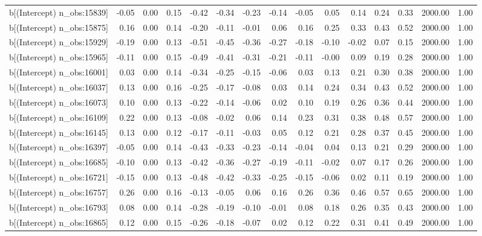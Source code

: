 \begin{table}[ht]
\begin{tabular}{rrrrrrrrrrrrrrr}
  b[(Intercept) n\_obs:15839] & -0.05 & 0.00 & 0.15 & -0.42 & -0.34 & -0.23 & -0.14 & -0.05 & 0.05 & 0.14 & 0.24 & 0.33 & 2000.00 & 1.00 \\ 
  b[(Intercept) n\_obs:15875] & 0.16 & 0.00 & 0.14 & -0.20 & -0.11 & -0.01 & 0.06 & 0.16 & 0.25 & 0.33 & 0.43 & 0.52 & 2000.00 & 1.00 \\ 
  b[(Intercept) n\_obs:15929] & -0.19 & 0.00 & 0.13 & -0.51 & -0.45 & -0.36 & -0.27 & -0.18 & -0.10 & -0.02 & 0.07 & 0.15 & 2000.00 & 1.00 \\ 
  b[(Intercept) n\_obs:15965] & -0.11 & 0.00 & 0.15 & -0.49 & -0.41 & -0.31 & -0.21 & -0.11 & -0.00 & 0.09 & 0.19 & 0.28 & 2000.00 & 1.00 \\ 
  b[(Intercept) n\_obs:16001] & 0.03 & 0.00 & 0.14 & -0.34 & -0.25 & -0.15 & -0.06 & 0.03 & 0.13 & 0.21 & 0.30 & 0.38 & 2000.00 & 1.00 \\ 
  b[(Intercept) n\_obs:16037] & 0.13 & 0.00 & 0.16 & -0.25 & -0.17 & -0.08 & 0.03 & 0.14 & 0.24 & 0.34 & 0.43 & 0.52 & 2000.00 & 1.00 \\ 
  b[(Intercept) n\_obs:16073] & 0.10 & 0.00 & 0.13 & -0.22 & -0.14 & -0.06 & 0.02 & 0.10 & 0.19 & 0.26 & 0.36 & 0.44 & 2000.00 & 1.00 \\ 
  b[(Intercept) n\_obs:16109] & 0.22 & 0.00 & 0.13 & -0.08 & -0.02 & 0.06 & 0.14 & 0.23 & 0.31 & 0.38 & 0.48 & 0.57 & 2000.00 & 1.00 \\ 
  b[(Intercept) n\_obs:16145] & 0.13 & 0.00 & 0.12 & -0.17 & -0.11 & -0.03 & 0.05 & 0.12 & 0.21 & 0.28 & 0.37 & 0.45 & 2000.00 & 1.00 \\ 
  b[(Intercept) n\_obs:16397] & -0.05 & 0.00 & 0.14 & -0.43 & -0.33 & -0.23 & -0.14 & -0.04 & 0.04 & 0.13 & 0.21 & 0.29 & 2000.00 & 1.00 \\ 
  b[(Intercept) n\_obs:16685] & -0.10 & 0.00 & 0.13 & -0.42 & -0.36 & -0.27 & -0.19 & -0.11 & -0.02 & 0.07 & 0.17 & 0.26 & 2000.00 & 1.00 \\ 
  b[(Intercept) n\_obs:16721] & -0.15 & 0.00 & 0.13 & -0.48 & -0.42 & -0.33 & -0.25 & -0.15 & -0.06 & 0.02 & 0.11 & 0.19 & 2000.00 & 1.00 \\ 
  b[(Intercept) n\_obs:16757] & 0.26 & 0.00 & 0.16 & -0.13 & -0.05 & 0.06 & 0.16 & 0.26 & 0.36 & 0.46 & 0.57 & 0.65 & 2000.00 & 1.00 \\ 
  b[(Intercept) n\_obs:16793] & 0.08 & 0.00 & 0.14 & -0.28 & -0.19 & -0.10 & -0.01 & 0.08 & 0.18 & 0.26 & 0.35 & 0.43 & 2000.00 & 1.00 \\ 
  b[(Intercept) n\_obs:16865] & 0.12 & 0.00 & 0.15 & -0.26 & -0.18 & -0.07 & 0.02 & 0.12 & 0.22 & 0.31 & 0.41 & 0.49 & 2000.00 & 1.00 \\ 

\end{tabular}
\end{table}
